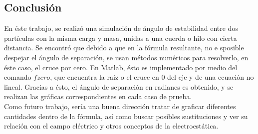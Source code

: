 \documentclass[12pt, letterpaper]{report}
\begin{document}
\subsection*{Conclusión}
En éste trabajo, se realizó una simulación de ángulo de estabilidad entre dos partículas con la misma carga y masa, unidas a una cuerda o hilo con cierta distancia. Se encontró que debido a que en la fórmula 
resultante, no e sposible despejar el ángulo de separación, se usan métodos numéricos para resolverlo, en éste caso, el cruce por cero. En Matlab, ésto es implementado por medio del comando $fzero$, que 
encuentra la raiz o el cruce en 0 del eje y de una ecuación no lineal. Gracias a ésto, el ángulo de separación en radianes es obtenido, y se realizan las gráficas 
correspondientes en cada caso de prueba. \\

Como futuro trabajo, sería una buena dirección tratar de graficar diferentes cantidades dentro de la fórmula, así como buscar posibles sustituciones y ver su relación con 
el campo eléctrico y otros conceptos de la electroestática. 
\end{document}
